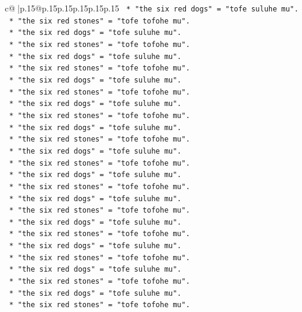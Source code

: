 \documentclass{article}
\begin{document}
{\begin{supertabular}{c@{$\;$}|p{.15\linewidth}@{}p{.15\linewidth}p{.15\linewidth}p{.15\linewidth}p{.15\linewidth}p{.15\linewidth}}
{{{\texttt{        *   "the six red dogs" = "tofe suluhe mu".} \\
\texttt{        *   "the six red stones" = "tofe tofohe mu".} \\
\texttt{        *   "the six red dogs" = "tofe suluhe mu".} \\
\texttt{        *   "the six red stones" = "tofe tofohe mu".} \\
\texttt{        *   "the six red dogs" = "tofe suluhe mu".} \\
\texttt{        *   "the six red stones" = "tofe tofohe mu".} \\
\texttt{        *   "the six red dogs" = "tofe suluhe mu".} \\
\texttt{        *   "the six red stones" = "tofe tofohe mu".} \\
\texttt{        *   "the six red dogs" = "tofe suluhe mu".} \\
\texttt{        *   "the six red stones" = "tofe tofohe mu".} \\
\texttt{        *   "the six red dogs" = "tofe suluhe mu".} \\
\texttt{        *   "the six red stones" = "tofe tofohe mu".} \\
\texttt{        *   "the six red dogs" = "tofe suluhe mu".} \\
\texttt{        *   "the six red stones" = "tofe tofohe mu".} \\
\texttt{        *   "the six red dogs" = "tofe suluhe mu".} \\
\texttt{        *   "the six red stones" = "tofe tofohe mu".} \\
\texttt{        *   "the six red dogs" = "tofe suluhe mu".} \\
\texttt{        *   "the six red stones" = "tofe tofohe mu".} \\
\texttt{        *   "the six red dogs" = "tofe suluhe mu".} \\
\texttt{        *   "the six red stones" = "tofe tofohe mu".} \\
\texttt{        *   "the six red dogs" = "tofe suluhe mu".} \\
\texttt{        *   "the six red stones" = "tofe tofohe mu".} \\
\texttt{        *   "the six red dogs" = "tofe suluhe mu".} \\
\texttt{        *   "the six red stones" = "tofe tofohe mu".} \\
\texttt{        *   "the six red dogs" = "tofe suluhe mu".} \\
\texttt{        *   "the six red stones" = "tofe tofohe mu".} \\
}}}
\end{supertabular}}
\end{document}
